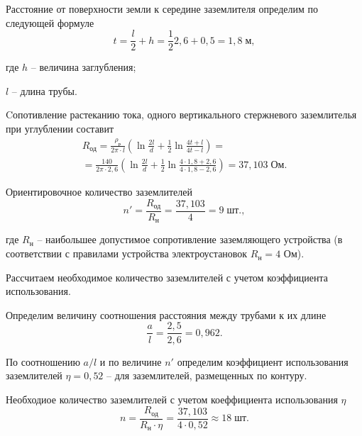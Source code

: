         Расстояние от поверхности земли к середине заземлителя определим по
        следующей формуле
        \begin{equation*}
            t = \frac{l}{2} + h = 
                \frac{1}{2} 2,6 + 0,5 = 1,8 \; \text{м},
        \end{equation*}

        где $h$ -- величина заглубления;\par
        $l$ -- длина трубы.

        Cопотивление растеканию тока, одного вертикального стержневого
        заземлителья при углублении составит
        \begin{gather*}
            R_\text{од} = \frac{\rho_\text{р}}{2\pi \cdot l}
                \left( \ln \frac{2l}{d} + \frac{1}{2} 
                    \ln \frac{4t + l}{4t - l} \right) =\\
            = \frac{140}{2\pi \cdot 2,6}
                \left( \ln \frac{2l}{d} + \frac{1}{2} 
                    \ln \frac{4 \cdot 1,8 + 2,6}{4 \cdot 1,8 - 2,6} \right)
                        = 37,103 \; \text{Ом}.
        \end{gather*}

        Ориентировочное количество заземлителей
        \begin{equation*}
            n' = \frac{R_\text{од}}{R_\text{н}}
                = \frac{37,103}{4} = 9 \; \text{шт.},
        \end{equation*}

        где $R_\text{н}$ -- наибольшее допустимое сопротивление
        заземляющего устройства (в соответствии с правилами устройства
        электроустановок $R_\text{н} = 4$ Ом). 

        Рассчитаем необходимое количество заземлителей с учетом коэффициента
        использования.

        Определим величину соотношения расстояния между трубами к их длине
        \begin{equation*}
            \frac{a}{l} = \frac{2,5}{2,6} = 0,962.
        \end{equation*}

        По соотношению $a/l$  и по величине $n'$ определим
        коэффициент использования заземлителей $\eta = 0,52$  -- для
        заземлителей, размещенных по контуру.

        Необходиое количество заземлителей с учетом коеффициента использования
        $\eta$
        \begin{equation*}
            n = \frac{R_\text{од}}{R_\text{н} \cdot \eta} =
                \frac{37,103}{4 \cdot 0,52} \approx 18 \; \text{шт}.
        \end{equation*}

